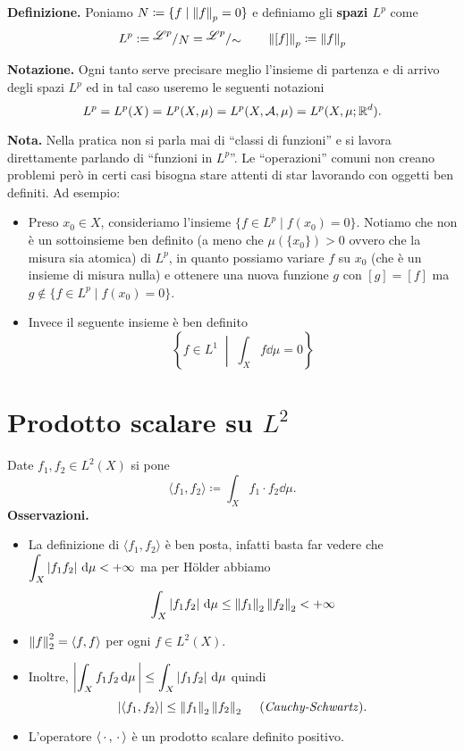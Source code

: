 \textbf{Definizione.}
Poniamo $N \coloneqq \{ f \mid \left\lVert f \right\rVert_p = 0 \}$ e definiamo gli \textbf{spazi $L^p$} come
$$
L^p := \sfrac{\mathscr L^p}{N} = \sfrac{\mathscr L^p}{\sim} 
\qquad
\norm{[f]}_p \coloneqq \norm{f}_p
$$

\textbf{Notazione.}
Ogni tanto serve precisare meglio l'insieme di partenza e di arrivo degli spazi $L^p$ ed in tal caso useremo le seguenti notazioni
$$
L^p = L^p(X) = L^p(X, \mu) = L^p(X, \mathcal{A}, \mu) = L^p(X, \mu; \mathbb R^d).
$$

\textbf{Nota.}
Nella pratica non si parla mai di ``classi di funzioni'' e si lavora direttamente parlando di ``funzioni in $L^p$''. Le ``operazioni'' comuni non creano problemi però in certi casi bisogna stare attenti di star lavorando con oggetti ben definiti. Ad esempio:
\begin{itemize}
	\item Preso $x_0 \in X$, consideriamo l'insieme $\{ f \in L^p \mid f(x_0) = 0 \}$. Notiamo che non è un sottoinsieme ben definito (a meno che $\mu(\{ x_0 \}) > 0$ ovvero che la misura sia atomica) di $L^p$, in quanto possiamo variare $f$ su $x_0$ (che è un insieme di misura nulla) e ottenere una nuova funzione $g$ con $[g] = [f]$ ma $g \notin \{ f \in L^p \mid f(x_0) = 0 \}$.

	\item Invece il seguente insieme è ben definito
		$$
		\left\{ f \in L^1 \;\middle|\; \int_X f \dd \mu = 0 \right\}
		$$
\end{itemize}


\section{Prodotto scalare su $L^2$}

Date $f_1,f_2 \in L^2(X)$ si pone
%
$$
\langle f_1, f_2 \rangle \coloneqq \int_{X}^{} f_1 \cdot f_2 \dd \mu.
$$
%
\textbf{Osservazioni.}

\begin{itemize}
\item La definizione di $\langle f_1, f_2 \rangle$ è ben posta, infatti basta far vedere che $\displaystyle \int_X \left| f_1 f_2 \right| \,\mathrm{d} \mu < +\infty$ ma per H\"older abbiamo
%
$$
\int_{X}^{} \left| f_1 f_2 \right| \,\mathrm{d} \mu \leq \left\lVert f_1 \right\rVert_2 \left\lVert f_2 \right\rVert_2 < +\infty
$$
%

\item $\left\lVert f \right\rVert_2^2 = \langle f,f \rangle$ per ogni $f \in L^2(X)$.

\item Inoltre, $\displaystyle \left| \int_X f_1 f_2 \,\mathrm{d} \mu \, \right| \leq \int_X \left| f_1 f_2 \right| \,\mathrm{d} \mu$ quindi
%
$$
\left| \langle f_1, f_2 \rangle \right| \leq \left\lVert f_1 \right\rVert_2 \left\lVert f_2 \right\rVert_2 \quad \; \text{(\textit{Cauchy-Schwartz})}.
$$

\item L'operatore $\langle \,\cdot\,, \,\cdot\, \rangle$ è un prodotto scalare definito positivo.

\end{itemize}

